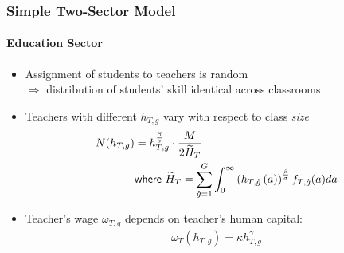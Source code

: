 \documentclass[11pt]{beamer}
\begin{document}
 \begin{frame}
		\frametitle{Simple Two-Sector Model}
        \framesubtitle{Education Sector}
			\begin{itemize}
				\item Assignment of students to teachers is random \\ $\Rightarrow$ distribution of students' skill identical across classrooms
				\item Teachers with different $h_{T,g}$ vary with respect to class {\it size}
				\begin{align*}
                    N(h_{T,g})&=h_{T,g}^\frac{\beta}{\sigma} \cdot \frac{M}{2\widetilde{H}_T}\\
                    &\textrm{{\sf where }} \widetilde{H}_T =\sum_{\hat{g}=1}^G \int_0^\infty \left( h_{T,\hat{g}}\left( a \right) \right)^{\frac{\beta}{\sigma}} f_{T,\hat{g}}(a) da
				\end{align*}
				\item Teacher's wage $\omega_{T,g}$ depends on teacher's human capital:
				\begin{align*}
					\omega_T(h_{T,g})  =  \kappa h_{T,g}^\gamma 

\end{align*}
\end{itemize}
\end{frame}
\end{document}
